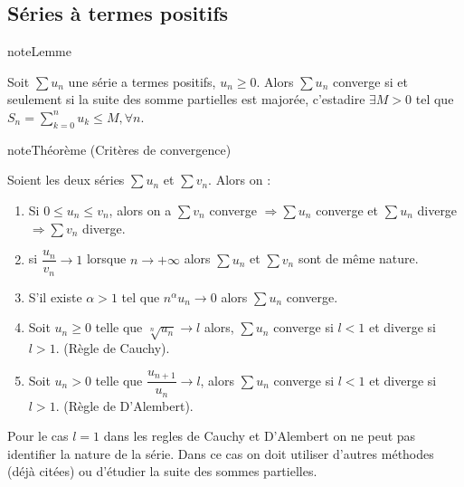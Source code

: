 \documentclass[letterpaper,10pt,french]{sphinxmanual}
\begin{document}
\subsection{Séries à termes positifs}
\label{\detokenize{series:series-a-termes-positifs}}
\begin{sphinxadmonition}{note}{Lemme}

\sphinxAtStartPar
Soit \(\sum u_n\) une série a termes positifs, \(u_n\geq 0\). Alors \(\sum u_n\) converge si et seulement si la suite des somme partielles est majorée, c’est\sphinxhyphen{}a\sphinxhyphen{}dire \(\exists M>0\) tel que \(S_n=\sum_{k=0}^n u_k \leq M, \forall n\).
\end{sphinxadmonition}

\begin{sphinxadmonition}{note}{Théorème (Critères de convergence)}

\sphinxAtStartPar
Soient les deux séries \(\sum u_n\) et \(\sum v_n\). Alors on :
\begin{enumerate}
%
\item {} 
\sphinxAtStartPar
Si \(0\leq u_n \leq v_n\), alors on a \(\sum v_n\) converge \(\Rightarrow \sum u_n\) converge et \(\sum u_n\) diverge \(\Rightarrow \sum v_n\) diverge.

\item {} 
\sphinxAtStartPar
si \(\dfrac{u_n}{v_n} \to 1\) lorsque \(n \to +\infty\) alors \(\sum u_n\) et \(\sum v_n\) sont de même nature.

\item {} 
\sphinxAtStartPar
S’il existe \(\alpha >1\) tel que \(n^\alpha u_n \to 0\) alors \(\sum u_n\) converge.

\item {} 
\sphinxAtStartPar
Soit \(u_n \geq 0\) telle que \(\sqrt[n]{u_n} \to l\) alors, \(\sum u_n\) converge si \(l<1\) et diverge si \(l>1\). (Règle de Cauchy).

\item {} 
\sphinxAtStartPar
Soit \(u_n>0\) telle que \(\dfrac{u_{n+1}}{u_n} \to l\), alors \(\sum u_n\) converge si \(l<1\) et diverge si \(l>1\). (Règle de D’Alembert).

\end{enumerate}

\sphinxAtStartPar
Pour le cas \(l=1\) dans les regles de Cauchy et D’Alembert on ne peut pas identifier la nature de la série. Dans ce cas on doit utiliser d’autres méthodes (déjà citées) ou d’étudier la suite des sommes partielles.
\end{sphinxadmonition}
\end{document}
